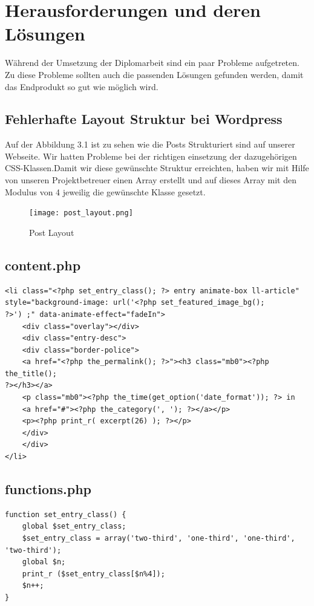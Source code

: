 \newpage

\section{Herausforderungen und deren Lösungen}
W\"ahrend der Umsetzung der Diplomarbeit sind ein paar Probleme aufgetreten. Zu diese Probleme sollten auch die passenden L\"osungen gefunden werden, damit das Endprodukt so gut wie m\"oglich wird.

\subsection{Fehlerhafte Layout Struktur bei Wordpress}
Auf der Abbildung 3.1 ist zu sehen wie die Posts Strukturiert sind auf unserer Webseite. Wir hatten Probleme bei der richtigen einsetzung der dazugeh\"origen CSS-Klassen.Damit wir diese gew\"unschte Struktur erreichten, haben wir mit Hilfe von unseren Projektbetreuer einen Array erstellt und auf dieses Array mit den Modulus von 4 jeweilig die gew\"unschte Klasse gesetzt.
\begin{figure}[!h]
  \texttt{[image: post\_layout.png]}
  \caption{Post Layout}
  \label{fig:Post_Layout}
\end{figure} 

\newpage
\subsection*{content.php}
\begin{verbatim}
<li class="<?php set_entry_class(); ?> entry animate-box ll-article"
style="background-image: url('<?php set_featured_image_bg();
?>') ;" data-animate-effect="fadeIn">
	<div class="overlay"></div> 	
	<div class="entry-desc"> 		
	<div class="border-police">			
	<a href="<?php the_permalink(); ?>"><h3 class="mb0"><?php the_title(); 
?></h3></a>
	<p class="mb0"><?php the_time(get_option('date_format')); ?> in 
    <a href="#"><?php the_category(', '); ?></a></p>
	<p><?php print_r( excerpt(26) ); ?></p>
	</div> 	
	</div> 
</li>		

\end{verbatim}

\subsection*{functions.php}

\begin{verbatim}
function set_entry_class() {
	global $set_entry_class;
	$set_entry_class = array('two-third', 'one-third', 'one-third', 'two-third');
	global $n;
	print_r ($set_entry_class[$n%4]);
	$n++;
}
\end{verbatim}


